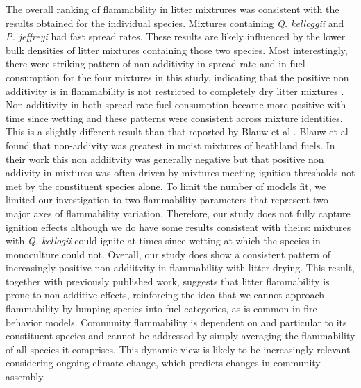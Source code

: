\documentclass[fire,article,submit,moreauthors,pdftex]{Definitions/mdpi}
\begin{document}


The overall ranking of flammability in litter mixtrures was consistent with the
results obtained for the individual species. Mixtures containing \emph{Q.
  kelloggii} and \emph{P. jeffreyi} had fast spread rates. These results are
likely influenced by the lower bulk densities of litter mixtures containing
those two species. Most interestingly, there were striking pattern of nan
additivity in spread rate and in fuel consumption for the four mixtures in this
study, indicating that the positive non additivity is in flammability is not
restricted to completely dry litter mixtures \citep{Magalhaes+Schwilk-2012,
  VanAltena+Logtestjin+etal-2012}. Non additivity in both spread rate fuel
consumption became more positive with time since wetting and these patterns
were consistent across mixture identities. This is a slightly different result
than that reported by Blauw et al \citeyear{Blauw+Wensink+etal-2015}. Blauw et
al found that non-addivity was greatest in moist mixtures of heathland fuels.
In their work this non addiitvity was generally negative but that positive non
addivity in mixtures was often driven by mixtures meeting ignition thresholds
not met by the constituent species alone. To limit the number of models fit, we
limited our investigation to two flammability parameters that represent two
major axes of flammability variation. Therefore, our study does not fully
capture ignition effects although we do have some results consistent with
theirs: mixtures with \emph{Q. kellogii} could ignite at times since wetting at
which the species in monoculture could not. Overall, our study does show a consistent pattern of increasingly positive non addiitvity in flammability with litter drying. This result, together with
previously published work, suggests that litter flammability is prone to
non-additive effects, reinforcing the idea that we cannot approach flammability
by lumping species into fuel categories, as is common in fire behavior models.
Community flammability is dependent on and particular to its constituent
species and cannot be addressed by simply averaging the flammability of all
species it comprises. This dynamic view is likely to be increasingly relevant
considering ongoing climate change, which predicts changes in community
assembly.
\end{document}
